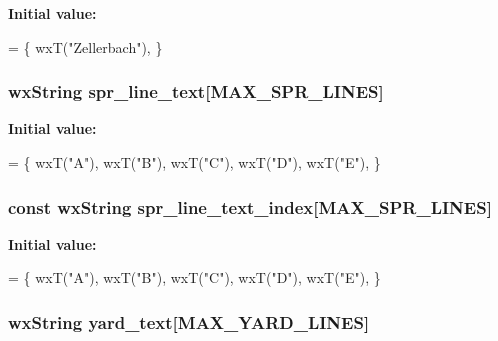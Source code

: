 {\bfseries Initial value\-:}
\begin{DoxyCode}
=
\{
    wxT(\textcolor{stringliteral}{"Zellerbach"}),
\}
\end{DoxyCode}
\hypertarget{a00190_a3ea2bd5fe720a1c305963493018ef961}{
\subsubsection[{spr\-\_\-line\-\_\-text}]{\setlength{\rightskip}{0pt plus 5cm}wx\-String spr\-\_\-line\-\_\-text\mbox{[}{\bf M\-A\-X\-\_\-\-S\-P\-R\-\_\-\-L\-I\-N\-E\-S}\mbox{]}}}\label{a00190_a3ea2bd5fe720a1c305963493018ef961}
{\bfseries Initial value\-:}
\begin{DoxyCode}
=
\{
    wxT(\textcolor{stringliteral}{"A"}), wxT(\textcolor{stringliteral}{"B"}), wxT(\textcolor{stringliteral}{"C"}), wxT(\textcolor{stringliteral}{"D"}), wxT(\textcolor{stringliteral}{"E"}),
\}
\end{DoxyCode}
\hypertarget{a00190_a7a6ae3e09522a20c3bb37d6b8eacb202}{
\subsubsection[{spr\-\_\-line\-\_\-text\-\_\-index}]{\setlength{\rightskip}{0pt plus 5cm}const wx\-String spr\-\_\-line\-\_\-text\-\_\-index\mbox{[}{\bf M\-A\-X\-\_\-\-S\-P\-R\-\_\-\-L\-I\-N\-E\-S}\mbox{]}}}\label{a00190_a7a6ae3e09522a20c3bb37d6b8eacb202}
{\bfseries Initial value\-:}
\begin{DoxyCode}
=
\{
    wxT(\textcolor{stringliteral}{"A"}), wxT(\textcolor{stringliteral}{"B"}), wxT(\textcolor{stringliteral}{"C"}), wxT(\textcolor{stringliteral}{"D"}), wxT(\textcolor{stringliteral}{"E"}),
\}
\end{DoxyCode}
\hypertarget{a00190_af2536937ab0e61abae2a6eac588bd630}{
\subsubsection[{yard\-\_\-text}]{\setlength{\rightskip}{0pt plus 5cm}wx\-String yard\-\_\-text\mbox{[}{\bf M\-A\-X\-\_\-\-Y\-A\-R\-D\-\_\-\-L\-I\-N\-E\-S}\mbox{]}}}\label{a00190_af2536937ab0e61abae2a6eac588bd630}
